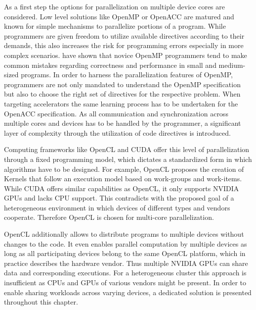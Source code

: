 As a first step the options for parallelization on multiple device cores are considered. Low level solutions like OpenMP or OpenACC are matured and known for simple mechanisms to parallelize portions of a program. While programmers are given freedom to utilize available directives according to their demands, this also increases the risk for programming errors especially in more complex scenarios. \citeauthor{openmp_mistakes} have shown that novice OpenMP programmers tend to make common mistakes regarding correctness and performance in small and medium-sized programs\cite{openmp_mistakes}. In order to harness the parallelization features of OpenMP, programmers are not only mandated to understand the OpenMP specification but also to choose the right set of directives for the respective problem. When targeting accelerators the same learning process has to be undertaken for the OpenACC specification. As all communication and synchronization across multiple cores and devices has to be handled by the programmer, a significant layer of complexity through the utilization of code directives is introduced.

Computing frameworks like OpenCL and CUDA offer this level of parallelization through a fixed programming model, which dictates a standardized form in which algorithms have to be designed. For example, OpenCL proposes the creation of Kernels that follow an execution model based on work-groups and work-items. While CUDA offers similar capabilities as OpenCL, it only supports NVIDIA GPUs and lacks CPU support. This contradicts with the proposed goal of a heterogeneous environment in which devices of different types and vendors cooperate. Therefore OpenCL is chosen for multi-core parallelization.

OpenCL additionally allows to distribute programs to multiple devices without changes to the code. It even enables parallel computation by multiple devices as long as all participating devices belong to the same OpenCL platform, which in practice describes the hardware vendor. Thus multiple NVIDIA GPUs can share data and corresponding executions. For a heterogeneous cluster this approach is insufficient as CPUs and GPUs of various vendors might be present. In order to enable sharing workloads across varying devices, a dedicated solution is presented throughout this chapter.

